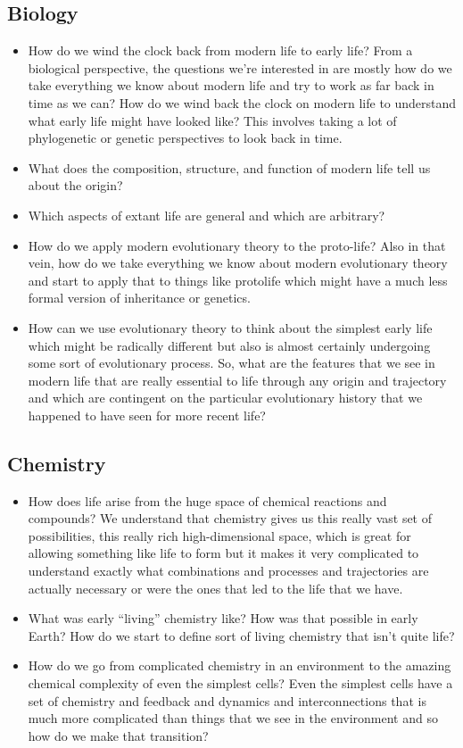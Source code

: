 \documentclass[]{article}
\begin{document}
\subsection{Biology}
\begin{itemize}
	\item How do we wind the clock back from modern life to early life? From a biological perspective, the questions we're interested in are mostly how do we take everything we know about modern life and try to work as far back in time as we can? How do we wind back the clock on modern life to understand what early life might have looked like?
	This involves taking a lot of phylogenetic or genetic perspectives to
	look back in time.
	\item  What does the composition, structure, and function of modern life tell us about the origin?
	\item  Which aspects of extant life are general and which are arbitrary?
	\item How do we apply modern evolutionary theory to the proto-life? Also in that vein, how do we take everything we know about modern evolutionary theory and start to apply that to things like protolife which might have a much less formal version of
	inheritance or genetics.
	\item How can we use evolutionary theory to think about the simplest early life which
	might be radically different but also is almost certainly undergoing some sort of
	evolutionary process. So, what are the features that we see in 	modern life that are really essential to life through any origin and trajectory and 	which are contingent on the particular evolutionary history that we happened to
	have seen for more recent life?
\end{itemize}	


\subsection{Chemistry}
\begin{itemize}
	\item How does life arise from the huge space of chemical reactions and compounds? 
	We understand that chemistry gives us 	this really vast set of possibilities, 	this really rich high-dimensional space, which is great for allowing something 	like life to form but it makes it very complicated to understand exactly what combinations and processes and trajectories are actually necessary or were the ones that led to the life that we have.
	\item What was early “living” chemistry like? How was that possible in early Earth? How do 	we start to define sort of living chemistry that isn't quite life?
	\item How do we go from complicated chemistry in an environment to the amazing chemical complexity of even the simplest cells? Even the simplest cells have a set of chemistry and feedback and dynamics and interconnections that is much more 
	complicated than things that we see in the environment and so how do we make that
	transition?
\end{itemize}
\end{document}
